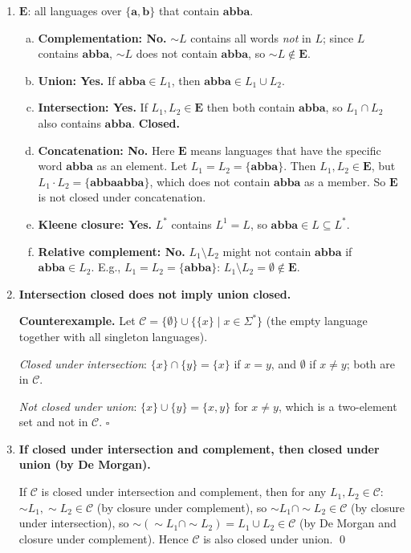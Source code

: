 \begin{enumerate}[{5.}1. ]
\item $\pmb{E}$: all languages over $\{\pmb{a},\pmb{b}\}$ that contain $\pmb{abba}$.

\begin{enumerate}[(a)]
  \item \textbf{Complementation: No.}  $\sim L$ contains all words \emph{not} in $L$; since $L$ contains $\pmb{abba}$, $\sim L$ does not contain $\pmb{abba}$, so $\sim L\notin\pmb{E}$.
  \item \textbf{Union: Yes.}  If $\pmb{abba}\in L_1$, then $\pmb{abba}\in L_1\cup L_2$.
  \item \textbf{Intersection: Yes.}  If $L_1,L_2\in\pmb{E}$ then both contain $\pmb{abba}$, so $L_1\cap L_2$ also contains $\pmb{abba}$.  \textbf{Closed.}
  \item \textbf{Concatenation: No.}  Here $\pmb{E}$ means languages that have
  the specific word $\pmb{abba}$ as an element.  Let
  $L_1=L_2=\{\pmb{abba}\}$.  Then $L_1,L_2\in\pmb{E}$, but
  $L_1\cdot L_2=\{\pmb{abbaabba}\}$, which does not contain $\pmb{abba}$ as a
  member.  So $\pmb{E}$ is not closed under concatenation.
  \item \textbf{Kleene closure: Yes.}  $L^*$ contains $L^1=L$, so $\pmb{abba}\in L\subseteq L^*$.
  \item \textbf{Relative complement: No.}  $L_1\setminus L_2$ might not contain $\pmb{abba}$ if $\pmb{abba}\in L_2$.  E.g., $L_1=L_2=\{\pmb{abba}\}$: $L_1\setminus L_2=\emptyset\notin\pmb{E}$.
\end{enumerate}

\item \textbf{Intersection closed does not imply union closed.}

\textbf{Counterexample.}  Let $\mathcal{C}=\{\emptyset\}\cup\{\{x\}\mid x\in\Sigma^*\}$ (the empty language together with all singleton languages).

\emph{Closed under intersection}: $\{x\}\cap\{y\}=\{x\}$ if $x=y$, and $\emptyset$ if $x\neq y$; both are in $\mathcal{C}$.

\emph{Not closed under union}: $\{x\}\cup\{y\}=\{x,y\}$ for $x\neq y$, which is a two-element set and not in $\mathcal{C}$. $\square$

\item \textbf{If closed under intersection and complement, then closed under union (by De Morgan).}

If $\mathcal{C}$ is closed under intersection and complement, then for any $L_1,L_2\in\mathcal{C}$:
$\sim L_1,\sim L_2\in\mathcal{C}$ (by closure under complement), so
$\sim L_1\cap\sim L_2\in\mathcal{C}$ (by closure under intersection), so
$\sim(\sim L_1\cap\sim L_2)=L_1\cup L_2\in\mathcal{C}$ (by De Morgan and closure under complement).  Hence $\mathcal{C}$ is also closed under union. \qed


\end{enumerate}

